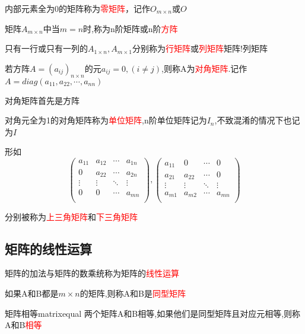 内部元素全为0的矩阵称为\textcolor{red}{零矩阵}，记作$O_{m\times n}$或$O$

矩阵$A_{m\times n}$中当$m=n$时,称为n阶矩阵或n阶\textcolor{red}{方阵}

只有一行或只有一列的$A_{1\times n},A_{m\times 1}$分别称为\textcolor{red}{行矩阵}或\textcolor{red}{列矩阵}{矩阵!列矩阵}

若方阵$A=(a_{ij})_{n\times n}$的元$a_{ij}=0,(i\neq j)$,则称A为\textcolor{red}{对角矩阵}.记作$A=diag(a_{11},a_{22},\cdots,a_{nn})$

\begin{note}
	对角矩阵首先是方阵
\end{note}

对角元全为1的对角矩阵称为\textcolor{red}{单位矩阵},n阶单位矩阵记为$I_n$,不致混淆的情况下也记为$I$

形如
\begin{equation*}
\begin{pmatrix}
		a_{11} &a_{12}&\cdots&a_{1n}\\
	0&a_{22}&\cdots&a_{2n}\\
	\vdots&\vdots&\ddots&\vdots\\
	0&0&\cdots&a_{mn}\\
\end{pmatrix},
\begin{pmatrix}
		a_{11} &0&\cdots&0\\
	a_{21}&a_{22}&\cdots&0\\
	\vdots&\vdots&\ddots&\vdots\\
	a_{m1}&a_{m2}&\cdots&a_{mn}\\
\end{pmatrix}
\end{equation*}

分别被称为\textcolor{red}{上三角矩阵}和\textcolor{red}{下三角矩阵}

\subsection{矩阵的线性运算}
\begin{note}
矩阵的加法与矩阵的数乘统称为矩阵的\textcolor{red}{线性运算}
\end{note}
如果A和B都是$m\times n$的矩阵,则称A和B是\textcolor{red}{同型矩阵}

\begin{definition}{矩阵相等}{matrixequal}
	两个矩阵A和B相等,如果他们是同型矩阵且对应元相等,则称A和B\textcolor{red}{相等}
\end{definition}

